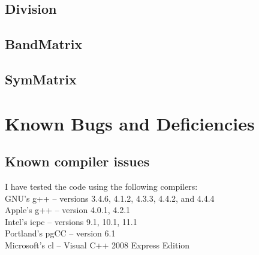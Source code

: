 \documentclass[twoside,letterpaper,11pt]{article}
\newcommand{\inputcode}[1]{}
\begin{document}
\inputcode{../examples/Matrix.cpp}
%
%
\vspace{12pt}

\newpage
\subsection{Division}

\inputcode{../examples/Division.cpp}
%
%
\vspace{12pt}

\newpage
\subsection{BandMatrix}

\inputcode{../examples/BandMatrix.cpp}
%
%
\vspace{12pt}

\newpage
\subsection{SymMatrix}

\inputcode{../examples/SymMatrix.cpp}
%
%


\newpage
\section{Known Bugs and Deficiencies}
\label{Bugs}

\subsection{Known compiler issues}
\label{Install_Issues}

I have tested the code using the following compilers:\\
$\quad$\\
GNU's g++ -- versions 3.4.6, 4.1.2, 4.3.3, 4.4.2, and 4.4.4\\
Apple's g++ -- version 4.0.1, 4.2.1 \\
Intel's icpc -- versions 9.1, 10.1, 11.1\\
Portland's pgCC -- version 6.1\\
Microsoft's cl -- Visual C++ 2008 Express Edition\\
\end{document}
